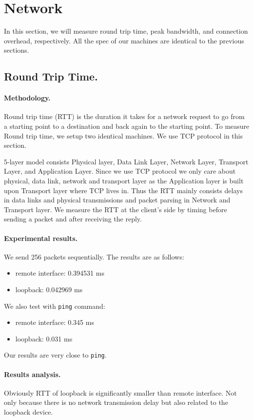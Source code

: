 \section{Network}
In this section, we will measure round trip time, peak bandwidth, and connection overhead, respectively. All the spec of our machines are identical to the previous sections.

\subsection{Round Trip Time.}
\paragraph{Methodology.} Round trip time (RTT) is the duration it takes for a network request to go from a starting point to a destination and back again to the starting point. To measure Round trip time, we setup two identical machines. We use TCP protocol in this section.

5-layer model consists Physical layer, Data Link Layer, Network Layer, Transport Layer, and Application Layer. Since we use TCP protocol we only care about physical, data link, network and transport layer as the Application layer is built upon Transport layer where TCP lives in. Thus the RTT mainly consists delays in data links and physical transmissions and packet parsing in Network and Transport layer. We measure the RTT at the client's side by timing before sending a packet and after receiving the reply.

\paragraph{Experimental results.}
We send 256 packets sequentially. The results are as follows:
\begin{itemize}[leftmargin=*]
	\item remote interface: 0.394531 ms
	\item loopback: 0.042969 ms
\end{itemize}
We also test with \texttt{ping} command:
\begin{itemize}[leftmargin=*]
	\item remote interface: 0.345 ms
	\item loopback: 0.031 ms
\end{itemize}
Our results are very close to \texttt{ping}.

\paragraph{Results analysis.} Obviously RTT of loopback is significantly smaller than remote interface. Not only because there is no network transmission delay but also related to the loopback device. 

